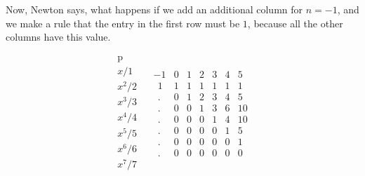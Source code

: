 \documentclass[11pt, oneside]{article}
\begin{document}
Now, Newton says, what happens if we add an additional column for $n=-1$, and we make a rule that the entry in the first row must be $1$, because all the other columns have this value.

\[
\begin{matrix}
\text{p}  \\
x/1  \\
x^2/2 \\
x^3/3 \\
x^4/4 \\
x^5/5 \\
x^6/6 \\
x^7/7
\end{matrix} \ \ \ \
\begin{matrix}
-1 & 0 & 1 & 2 & 3 & 4 & 5  \\
\ \ 1 & 1 & 1 & 1 & 1 & 1 & 1  \\
\ \ . & 0 & 1 & 2 & 3 & 4 & 5 \\
\ \ . & 0 & 0 & 1 & 3 & 6 & 10 \\
\ \ . & 0 & 0 & 0 & 1 & 4 & 10 \\
\ \ . & 0 & 0 & 0 & 0 & 1 & 5 \\
\ \ . & 0 & 0 & 0 & 0 & 0 & 1 \\
\ \ . & 0 & 0 & 0 & 0 & 0 & 0
\end{matrix}
\]
\end{document}
